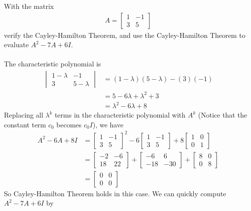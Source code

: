 \begin{exmp}
With the matrix
\begin{align*}
A = 
\begin{bmatrix}
1 & -1 \\
3 & 5
\end{bmatrix}
\end{align*}
verify the Cayley-Hamilton Theorem, and use the Cayley-Hamilton Theorem to evaluate $A^2 - 7A + 6I$.\\
\\
The characteristic polynomial is
\begin{align*}
\begin{vmatrix}
1-\lambda & -1 \\
3 & 5-\lambda
\end{vmatrix}  
&= (1-\lambda)(5-\lambda) - (3)(-1) \\
&= 5 - 6 \lambda + \lambda^2 + 3 \\
&= \lambda^2 - 6\lambda + 8
\end{align*}
Replacing all $\lambda^k$ terms in the characteristic polynomial with $A^k$ (Notice that the constant term $c_0$ becomes $c_0 I$), we have
\begin{align*}
A^2 - 6A + 8I &= 
\begin{bmatrix}
1 & -1 \\
3 & 5
\end{bmatrix}^2
- 6
\begin{bmatrix}
1 & -1 \\
3 & 5
\end{bmatrix} 
+ 8
\begin{bmatrix}
1 & 0 \\
0 & 1
\end{bmatrix} \\
&=
\begin{bmatrix}
-2 & -6 \\
18 & 22
\end{bmatrix}
+
\begin{bmatrix}
-6 & 6 \\
-18 & -30
\end{bmatrix} 
+
\begin{bmatrix}
8 & 0 \\
0 & 8
\end{bmatrix} \\
&=
\begin{bmatrix}
0 & 0\\
0 & 0
\end{bmatrix}
\end{align*}
So Cayley-Hamilton Theorem holds in this case. We can quickly compute $A^2 - 7A + 6I$ by

\end{exmp}
